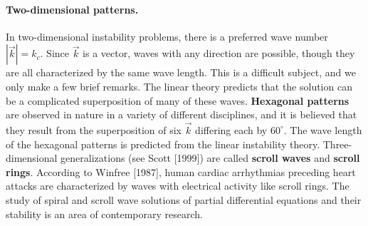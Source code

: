 \paragraph{Two-dimensional patterns.}
In two-dimensional instability problems, there is a preferred wave number $|\vec{k}| = k_c$. Since $\vec{k}$ is a vector, waves with any direction are possible, though they are all characterized by the same wave length. This is a difficult subject, and we only make a few brief remarks. The linear theory predicts that the solution can be a complicated superposition of many of these waves. \textbf{Hexagonal patterns} are observed in nature in a variety of different disciplines, and it is believed that they result from the superposition of six $\vec{k}$ differing each by $60^\circ$. The wave length of the hexagonal patterns is predicted from the linear instability theory. Three-dimensional generalizations (see Scott [1999]) are called \textbf{scroll waves} and \textbf{scroll rings}. According to Winfree [1987], human cardiac arrhythmias preceding heart attacks are characterized by waves with electrical activity like scroll rings. The study of spiral and scroll wave solutions of partial differential equations and their stability is an area of contemporary research.

